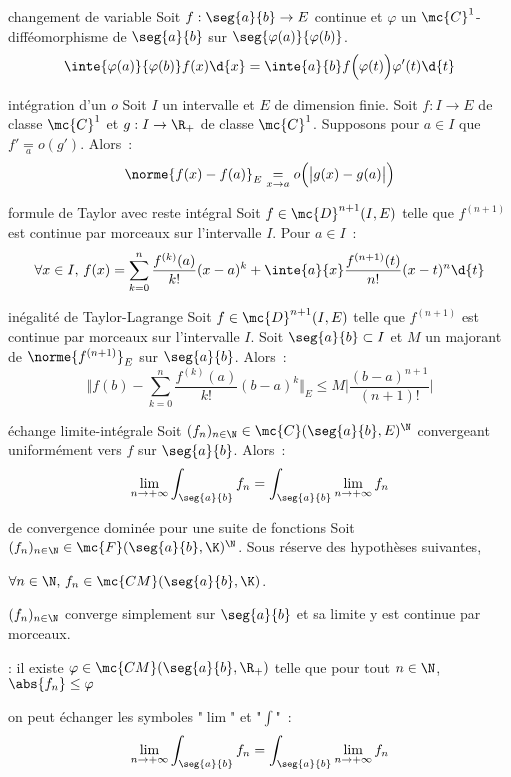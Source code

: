 \begin{adjustwidth}{-3cm}{-3cm}
\begin{theoreme}{10.39}{changement de variable}
    Soit $f:\seg{a}{b}\to E$ continue et $\varphi$ un $\mc{C}^1$-difféomorphisme de $\seg{a}{b}$ sur $\seg{\varphi(a)}{\varphi(b)}$.
    $$\inte{\varphi(a)}{\varphi(b)}f(x)\d{x} = \inte{a}{b}f\Bigl(\varphi(t)\Bigr)\varphi'(t)\d{t}$$
\end{theoreme}

\begin{theoreme}{10.42}{intégration d'un $o$}
    Soit $I$ un intervalle et $E$ de dimension finie. Soit $f:I \to E$ de classe $\mc{C}^1$ et $g:I\to \R_+$ de classe $\mc{C}^1$. Supposons pour $a \in I$ que $f' \underset{a}{=}o(g')$. Alors~:
    $$\norme{f(x) - f(a)}_E \underset{x \to a}{=} o\Big(\big\vert g(x) - g(a) \big\vert\Big)$$
\end{theoreme}

\begin{theoreme}{10.47}{formule de Taylor avec reste intégral}
    Soit $f\in \mc{D}^{n+1}(I,E)$ telle que $f^{(n+1)}$ est continue par morceaux sur l'intervalle $I$. Pour $a \in I$~:
    $$\forall x \in I,\, f(x) = \sum_{k=0}^n \frac{f^{(k)}(a)}{k!}(x-a)^k + \inte{a}{x}\frac{f^{(n+1)}(t)}{n!}(x-t)^n \d{t}$$
\end{theoreme}


\begin{theoreme}{10.48}{inégalité de Taylor-Lagrange}
    Soit $f\in \mc{D}^{n+1}(I,E)$ telle que $f^{(n+1)}$ est continue par morceaux sur l'intervalle $I$. Soit $\seg{a}{b} \subset I$ et $M$ un majorant de $\norme{f^{(n+1)}}_E$ sur $\seg{a}{b}$. Alors~:
    $$\Bigg\Vert f(b) - \sum_{k=0}^n \frac{f^{(k)}(a)}{k!}(b-a)^k\Bigg\Vert_E \leq M \bigg\vert \frac{(b-a)^{n+1}}{(n+1)!} \bigg\vert$$
\end{theoreme}

\begin{theoreme}{10.57}{échange limite-intégrale}
    Soit $(f_n)_{n \in \N} \in \mc{C}(\seg{a}{b},E)^\N$ convergeant uniformément vers $f$ sur $\seg{a}{b}$. Alors~:
    $$\lim_{n \to +\infty} \int_{\seg{a}{b}} f_n = \int_{\seg{a}{b}} \lim_{n \to +\infty} f_n $$
\end{theoreme}

\begin{theoreme}{10.62}{de convergence dominée pour une suite de fonctions}
    Soit $(f_n)_{n \in \N} \in \mc{F}(\seg{a}{b},\K)^\N$. Sous réserve des hypothèses suivantes,
    \begin{enumeratebf}
        \item $\forall n \in \N,\, f_n \in \mc{CM}(\seg{a}{b},\K)$.
        \item $(f_n)_{n \in \N}$ converge simplement sur $\seg{a}{b}$ et sa limite y est continue par morceaux.
        \item {} : il existe $\varphi \in \mc{CM}(\seg{a}{b}, \R_+)$  telle que pour tout $n \in \N$,\, $\abs{f_n} \leq \varphi$
    \end{enumeratebf}
    on peut échanger les symboles "$\lim$" et "$\int$"~:
    $$\lim_{n \to +\infty} \int_{\seg{a}{b}} f_n = \int_{\seg{a}{b}} \lim_{n \to +\infty} f_n $$
\end{theoreme}


\end{adjustwidth}
